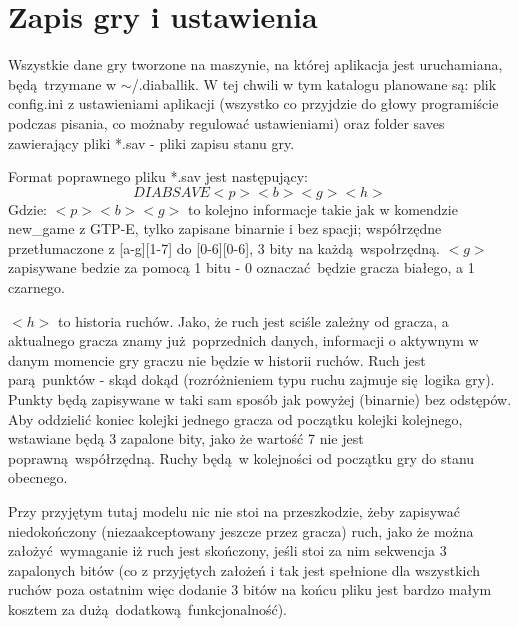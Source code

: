 \documentclass[a4paper,12pt]{article}
\begin{document}
\section{Zapis gry i ustawienia}
Wszystkie dane gry tworzone na maszynie, na której aplikacja jest uruchamiana, będą trzymane w $\sim$/.diaballik. W tej chwili w tym katalogu
planowane są: plik config.ini z ustawieniami aplikacji (wszystko co przyjdzie do głowy programiście podczas pisania, co możnaby regulować 
ustawieniami) oraz folder saves zawierający pliki *.sav - pliki zapisu stanu gry.

Format poprawnego pliku *.sav jest następujący: 
\[DIABSAVE<p><b><g><h>\]
Gdzie: $<p><b><g>$ to kolejno informacje takie jak w komendzie new\_game z GTP-E, tylko zapisane binarnie i bez spacji; współrzędne przetłumaczone z [a-g][1-7]
do [0-6][0-6], 3 bity na każdą wspołrzędną. $<g>$ zapisywane bedzie za pomocą 1 bitu - 0 oznaczać będzie gracza białego, a 1 czarnego.

$<h>$ to historia ruchów. Jako, że ruch jest sciśle zależny od gracza, a aktualnego gracza znamy już poprzednich danych, informacji o aktywnym 
w danym momencie gry graczu nie będzie w historii ruchów. Ruch jest parą punktów - skąd dokąd (rozróżnieniem typu ruchu zajmuje się logika gry).
Punkty będą zapisywane w taki sam sposób jak powyżej (binarnie) bez odstępów. Aby oddzielić koniec kolejki jednego gracza od początku kolejki 
kolejnego, wstawiane będą 3 zapalone bity, jako że wartość 7 nie jest poprawną współrzędną. Ruchy będą w kolejności od początku gry do stanu 
obecnego.

Przy przyjętym tutaj modelu nic nie stoi na przeszkodzie, żeby zapisywać niedokończony (niezaakceptowany jeszcze przez gracza) ruch, jako że można
założyć wymaganie iż ruch jest skończony, jeśli stoi za nim sekwencja 3 zapalonych bitów (co z przyjętych założeń i tak jest spełnione dla wszystkich
ruchów poza ostatnim więc dodanie 3 bitów na końcu pliku jest bardzo małym kosztem za dużą dodatkową funkcjonalność).
\end{document}
